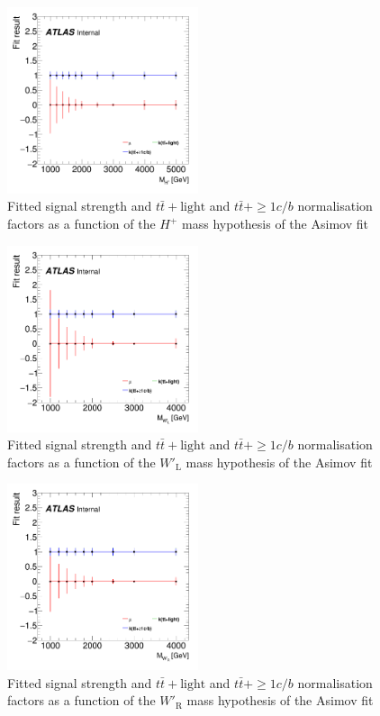\begin{figure}[H]
  \centering
  \includegraphics[width=0.50\textwidth]{images/ProfileLHFit/FitResults_Hp.png}
  \caption{Fitted signal strength and $t\bar{t}+\text{light}$ and $t\bar{t}+{\geq}1c/b$ normalisation factors as a function of the $H^{+}$ mass hypothesis of the Asimov fit}
  \label{fig:AsimovFitResultsSummary_Hp}
\end{figure}

\begin{figure}[H]
  \centering
  \includegraphics[width=0.50\textwidth]{images/ProfileLHFit/FitResults_WpLH.png}
  \caption{Fitted signal strength and $t\bar{t}+\text{light}$ and $t\bar{t}+{\geq}1c/b$ normalisation factors as a function of the $W'_{\text{L}}$ mass hypothesis of the Asimov fit}
  \label{fig:AsimovFitResultsSummary_WpLH}
\end{figure}

\begin{figure}[H]
  \centering
  \includegraphics[width=0.50\textwidth]{images/ProfileLHFit/FitResults_WpRH.png}
  \caption{Fitted signal strength and $t\bar{t}+\text{light}$ and $t\bar{t}+{\geq}1c/b$ normalisation factors as a function of the $W'_{\text{R}}$ mass hypothesis of the Asimov fit}
  \label{fig:AsimovFitResultsSummary_WpRH}
\end{figure}

